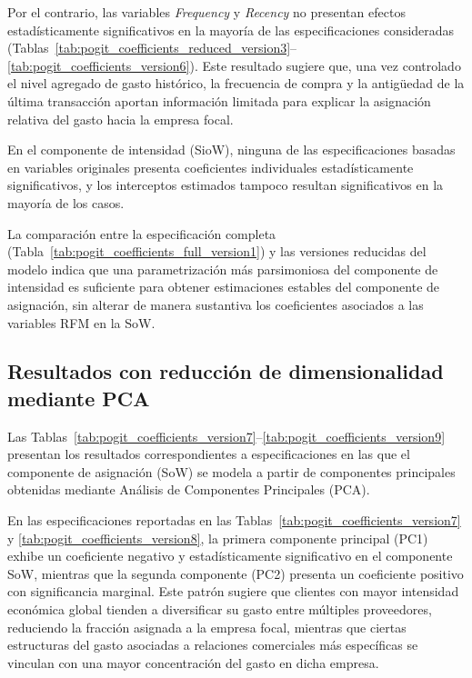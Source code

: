     Por el contrario, las variables \textit{Frequency} y \textit{Recency} no presentan efectos estadísticamente significativos en la mayoría de las especificaciones consideradas (Tablas~\ref{tab:pogit_coefficients_reduced_version3}–\ref{tab:pogit_coefficients_version6}). Este resultado sugiere que, una vez controlado el nivel agregado de gasto histórico, la frecuencia de compra y la antigüedad de la última transacción aportan información limitada para explicar la asignación relativa del gasto hacia la empresa focal.

    En el componente de intensidad (SioW), ninguna de las especificaciones basadas en variables originales presenta coeficientes individuales estadísticamente significativos, y los interceptos estimados tampoco resultan significativos en la mayoría de los casos. 

    La comparación entre la especificación completa (Tabla~\ref{tab:pogit_coefficients_full_version1}) y las versiones reducidas del modelo indica que una parametrización más parsimoniosa del componente de intensidad es suficiente para obtener estimaciones estables del componente de asignación, sin alterar de manera sustantiva los coeficientes asociados a las variables RFM en la SoW.

\subsection{Resultados con reducción de dimensionalidad mediante PCA}
    Las Tablas~\ref{tab:pogit_coefficients_version7}–\ref{tab:pogit_coefficients_version9} presentan los resultados correspondientes a especificaciones en las que el componente de asignación (SoW) se modela a partir de componentes principales obtenidas mediante Análisis de Componentes Principales (PCA).

    En las especificaciones reportadas en las Tablas~\ref{tab:pogit_coefficients_version7} y \ref{tab:pogit_coefficients_version8}, la primera componente principal (PC1) exhibe un coeficiente negativo y estadísticamente significativo en el componente SoW, mientras que la segunda componente (PC2) presenta un coeficiente positivo con significancia marginal. Este patrón sugiere que clientes con mayor intensidad económica global tienden a diversificar su gasto entre múltiples proveedores, reduciendo la fracción asignada a la empresa focal, mientras que ciertas estructuras del gasto asociadas a relaciones comerciales más específicas se vinculan con una mayor concentración del gasto en dicha empresa.

